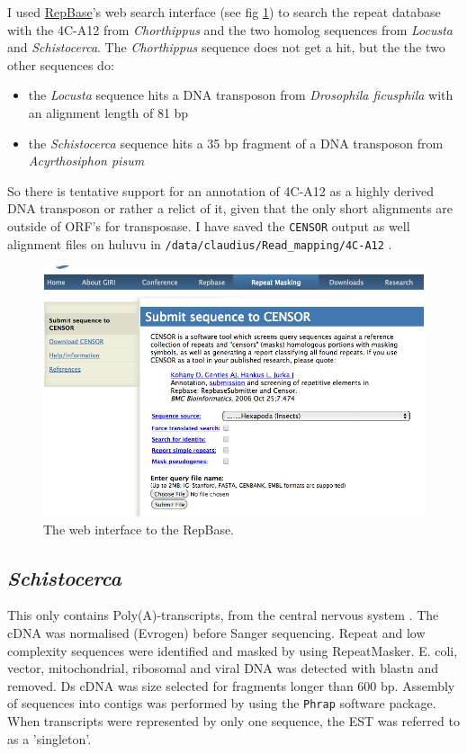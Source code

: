 \documentclass{article}\usepackage[]{graphicx}\usepackage[]{color}
\begin{document}
I used \href{http://www.girinst.org/censor/index.php}{\textsf{RepBase}}'s web search interface (see fig \ref{censor}) to search the repeat database with the 4C-A12 from \textit{Chorthippus} and the two homolog sequences from \textit{Locusta} and \textit{Schistocerca}. The \textit{Chorthippus} sequence does not get a hit, but the the two other sequences do:
\begin{itemize}
\item the \textit{Locusta} sequence hits a DNA transposon from \textit{Drosophila ficusphila} with an alignment length of 81 bp
\item the \textit{Schistocerca} sequence hits a 35 bp fragment of a DNA transposon from \textit{Acyrthosiphon pisum}
\end{itemize}
So there is tentative support for an annotation of 4C-A12 as a highly derived DNA transposon or rather a relict of it, given that the only short alignments are outside of ORF's for transposase. I have saved the \texttt{CENSOR} output as well alignment files on huluvu in \texttt{/data/claudius/Read\_mapping/4C-A12} .

\begin{figure}
\includegraphics[width=.9\textwidth]{./figure/CENSOR}
\caption{The web interface to the RepBase.}
\label{censor}
\end{figure}


\subsection{\textit{Schistocerca}}

This only contains Poly(A)-transcripts, from the central nervous system \citep{Badisco2011}. The cDNA was normalised (Evrogen) before Sanger sequencing. Repeat and low complexity sequences were identified and masked by using \textsf{RepeatMasker}. E. coli, vector, mitochondrial, ribosomal and viral DNA was detected with \textsf{blastn} and removed. Ds cDNA was size selected for fragments longer than 600 bp. Assembly of sequences into contigs was performed by using the \texttt{Phrap} software package. When transcripts were represented by only one sequence, the EST was referred to as a 'singleton'.
\end{document}
